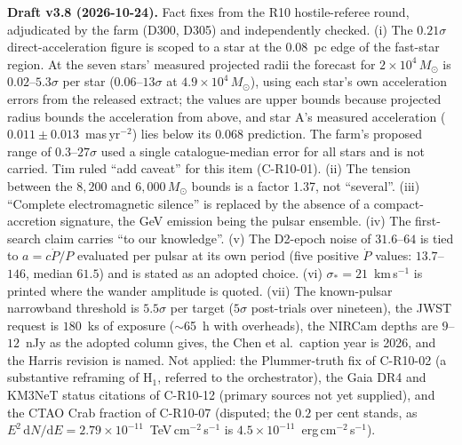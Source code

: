 \documentclass[11pt]{article}
\newcommand{\msun}{\ensuremath{M_\odot}}
\begin{document}
\textbf{Draft v3.8 (2026-10-24).} Fact fixes from the R10 hostile-referee round, adjudicated by the farm (D300, D305) and independently checked. (i) The $0.21\sigma$ direct-acceleration figure is scoped to a star at the $0.08$~pc edge of the fast-star region. At the seven stars' measured projected radii the forecast for $2\times10^{4}\,\msun$ is $0.02$--$5.3\sigma$ per star ($0.06$--$13\sigma$ at $4.9\times10^{4}\,\msun$), using each star's own acceleration errors from the released extract; the values are upper bounds because projected radius bounds the acceleration from above, and star A's measured acceleration ($0.011\pm0.013$~mas\,yr$^{-2}$) lies below its $0.068$ prediction. The farm's proposed range of $0.3$--$27\sigma$ used a single catalogue-median error for all stars and is not carried. Tim ruled ``add caveat'' for this item (C-R10-01). (ii) The tension between the $8{,}200$ and $6{,}000\,\msun$ bounds is a factor 1.37, not ``several''. (iii) ``Complete electromagnetic silence'' is replaced by the absence of a compact-accretion signature, the GeV emission being the pulsar ensemble. (iv) The first-search claim carries ``to our knowledge''. (v) The D2-epoch noise of $31.6$--$64$ is tied to $a=c\dot P/P$ evaluated per pulsar at its own period (five positive $\dot P$ values: $13.7$--$146$, median $61.5$) and is stated as an adopted choice. (vi) $\sigma_{*}=21$~km\,s$^{-1}$ is printed where the wander amplitude is quoted. (vii) The known-pulsar narrowband threshold is $5.5\sigma$ per target ($5\sigma$ post-trials over nineteen), the JWST request is $180$~ks of exposure ($\sim$65~h with overheads), the NIRCam depths are $9$--$12$~nJy as the adopted column gives, the Chen et al.\ caption year is 2026, and the Harris revision is named. Not applied: the Plummer-truth fix of C-R10-02 (a substantive reframing of H$_1$, referred to the orchestrator), the Gaia DR4 and KM3NeT status citations of C-R10-12 (primary sources not yet supplied), and the CTAO Crab fraction of C-R10-07 (disputed; the $0.2$ per cent stands, as $E^{2}\,\mathrm{d}N/\mathrm{d}E = 2.79\times10^{-11}$~TeV\,cm$^{-2}$\,s$^{-1}$ is $4.5\times10^{-11}$~erg\,cm$^{-2}$\,s$^{-1}$).
\end{document}
